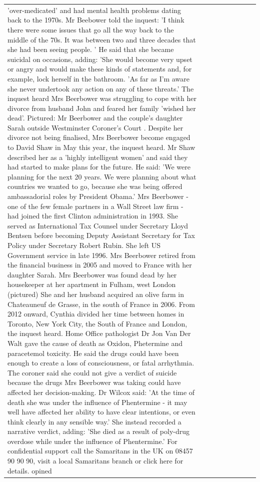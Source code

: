 \begin{table}[H]
\begin{tabular}{lllrlllll}
'over-medicated' and had mental health problems dating back to the 1970s. Mr Beebower told the inquest: 'I think there were some issues that go all the way back to the middle of the 70s. It was between two and three decades that she had been seeing people. ' He said that she became suicidal on occasions, adding: 'She would become very upset or angry and would make these kinds of statements and, for example, lock herself in the bathroom. 'As far as I'm aware she never undertook any action on any of these threats.' The inquest heard Mrs Beerbower was struggling to cope with her divorce from husband John and feared her family 'wished her dead'. Pictured: Mr Beerbower and the couple's daughter Sarah outside Westminster Coroner's Court . Despite her divorce not being finalised, Mrs Beerbower become engaged to David Shaw in May this year, the inquest heard. Mr Shaw described her as a 'highly intelligent women' and said they had started to make plans for the future. He said: 'We were planning for the next 20 years. We were planning about what countries we wanted to go, because she was being offered ambassadorial roles by President Obama.' Mrs Beerbower - one of the few female partners in a Wall Street law firm - had joined the first Clinton administration in 1993. She served as International Tax Counsel under Secretary Lloyd Bentsen before becoming Deputy Assistant Secretary for Tax Policy under Secretary Robert Rubin. She left US Government service in late 1996. Mrs Beerbower retired from the financial business in 2005 and moved to France with her daughter Sarah. Mrs Beerbower was found dead by her housekeeper at her apartment in Fulham, west London (pictured) She and her husband acquired an olive farm in Chateauneuf de Grasse, in the south of France in 2006. From 2012 onward, Cynthia divided her time between homes in Toronto, New York City, the South of France and London, the inquest heard. Home Office pathologist Dr Jon Van Der Walt gave the cause of death as Oxidon, Phetermine and paracetemol toxicity. He said the drugs could have been enough to create a loss of consciousness, or fatal arrhythmia. The coroner said she could not give a verdict of suicide because the drugs Mrs Beerbower was taking could have affected her decision-making. Dr Wilcox said: 'At the time of death she was under the influence of Phentermine - it may well have affected her ability to have clear intentions, or even think clearly in any sensible way.' She instead recorded a narrative verdict, adding: 'She died as a result of poly-drug overdose while under the influence of Phentermine.' For confidential support call the Samaritans in the UK on 08457 90 90 90, visit a local Samaritans branch or click here for details. opined \\

\end{tabular}
\end{table}
